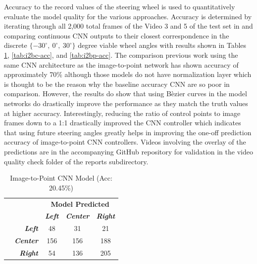 \documentclass[conference]{IEEEtran}
\begin{document}
Accuracy to the record values of the steering wheel is used to quantitatively evaluate the model quality for the various approaches. Accuracy is determined by iterating through all 2,000 total frames of the Video 3 and 5 of the test set in \cite{bechtel2018} and comparing continuous CNN outputs to their closest correspondence in the discrete $\lbrace -30^\circ,\ 0^\circ,\ 30^\circ\rbrace$ degree viable wheel angles with results shown in Tables \ref{tab:i2p-acc}, \ref{tab:i2bc-acc}, and \ref{tab:i2bp-acc}. The comparison previous work \cite{bechtel2018} using the same CNN architecture as the image-to-point network has shown accuracy of approximately 70\% although those models do not have normalization layer which is thought to be the reason why the baseline accuracy CNN are so poor in comparison. However, the results do show that using B\`ezier curves in the model networks do drastically improve the performance as they match the truth values at higher accuracy. Interestingly, reducing the ratio of control points to image frames down to a 1:1 drastically improved the CNN controller which indicates that using future steering angles greatly helps in improving the one-off prediction accuracy of image-to-point CNN controllers. Videos involving the overlay of the predictions are in the accompanying GitHub repository for validation in the video quality check folder of the reports subdirectory.


\begin{table}[btp]
	\centering
	\caption{Image-to-Point CNN Model (Acc: 20.45\%)}
	\begin{tabular}{|c|r|c|c|c|}
       \multicolumn{2}{c}{} & \multicolumn{3}{c}{\bfseries Model Predicted}\\\cline{3-5}
       \multicolumn{1}{c}{} & & \textbf{\textit{Left}} & \textbf{\textit{Center}} & \textbf{\textit{Right}}\\\hline
        \parbox[t]{2mm}{} & \textbf{\textit{Left}} & 48 & 31 & 21 \\
        & \textbf{\textit{Center}} & 156 & 156 & 188 \\
		& \textbf{\textit{Right}} & 54 & 136 & 205 \\\hline
	\end{tabular}
	\label{tab:i2p-acc}
\end{table}
    
\end{document}
